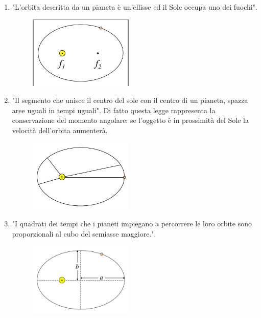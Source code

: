 \begin{enumerate}
    \item "L'orbita descritta da un pianeta è un'ellisse ed il Sole occupa uno dei fuochi".

    \begin{figure}[H]
        \centering
        \includegraphics[width=5cm]{2dic/1LeggeKeplero.jpg}
        \label{fig:1k}
    \end{figure}

    \item "Il segmento che unisce il centro del sole con il centro di un pianeta, spazza aree uguali in tempi uguali". Di fatto questa legge rappresenta la conservazione del momento angolare: se l'oggetto è in prossimità del Sole la velocità dell'orbita aumenterà.

    \begin{figure}[H]
        \centering
        \includegraphics[width=5cm]{2dic/2LeggeKeplero.jpg}
        \label{fig:2k}
    \end{figure}

    \item "I quadrati dei tempi che i pianeti impiegano a percorrere le loro orbite sono proporzionali al cubo del semiasse maggiore.".

    \begin{figure}[H]
        \centering
        \includegraphics[width=5cm]{2dic/3LeggeKeplero.jpg}
        \label{fig:3k}
    \end{figure}
\end{enumerate}

